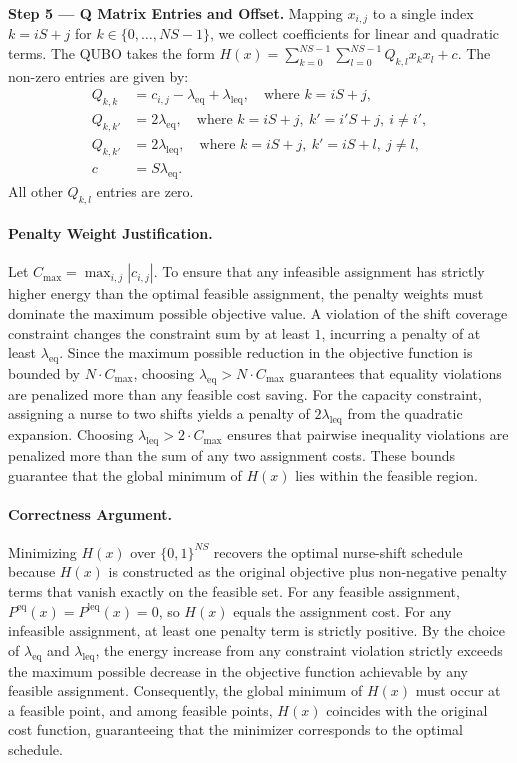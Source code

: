 \documentclass[12pt]{article}
\begin{document}
\textbf{Step 5 --- Q Matrix Entries and Offset.}
Mapping $x_{i,j}$ to a single index $k = iS + j$ for $k \in \{0, \dots, NS-1\}$, we collect coefficients for linear and quadratic terms. The QUBO takes the form $H(x) = \sum_{k=0}^{NS-1} \sum_{l=0}^{NS-1} Q_{k,l} x_k x_l + c$. The non-zero entries are given by:
\begin{align}
Q_{k,k} &= c_{i,j} - \lambda_{\text{eq}} + \lambda_{\text{leq}}, \quad \text{where } k = iS + j, \\
Q_{k,k'} &= 2\lambda_{\text{eq}}, \quad \text{where } k = iS + j, \ k' = i'S + j, \ i \neq i', \\
Q_{k,k'} &= 2\lambda_{\text{leq}}, \quad \text{where } k = iS + j, \ k' = iS + l, \ j \neq l, \\
c &= S \lambda_{\text{eq}}.
\end{align}
All other $Q_{k,l}$ entries are zero.

\paragraph{Penalty Weight Justification.}
Let $C_{\max} = \max_{i,j} |c_{i,j}|$. To ensure that any infeasible assignment has strictly higher energy than the optimal feasible assignment, the penalty weights must dominate the maximum possible objective value. A violation of the shift coverage constraint changes the constraint sum by at least $1$, incurring a penalty of at least $\lambda_{\text{eq}}$. Since the maximum possible reduction in the objective function is bounded by $N \cdot C_{\max}$, choosing $\lambda_{\text{eq}} > N \cdot C_{\max}$ guarantees that equality violations are penalized more than any feasible cost saving. For the capacity constraint, assigning a nurse to two shifts yields a penalty of $2\lambda_{\text{leq}}$ from the quadratic expansion. Choosing $\lambda_{\text{leq}} > 2 \cdot C_{\max}$ ensures that pairwise inequality violations are penalized more than the sum of any two assignment costs. These bounds guarantee that the global minimum of $H(x)$ lies within the feasible region.

\paragraph{Correctness Argument.}
Minimizing $H(x)$ over $\{0,1\}^{NS}$ recovers the optimal nurse-shift schedule because $H(x)$ is constructed as the original objective plus non-negative penalty terms that vanish exactly on the feasible set. For any feasible assignment, $P^{\text{eq}}(x) = P^{\text{leq}}(x) = 0$, so $H(x)$ equals the assignment cost. For any infeasible assignment, at least one penalty term is strictly positive. By the choice of $\lambda_{\text{eq}}$ and $\lambda_{\text{leq}}$, the energy increase from any constraint violation strictly exceeds the maximum possible decrease in the objective function achievable by any feasible assignment. Consequently, the global minimum of $H(x)$ must occur at a feasible point, and among feasible points, $H(x)$ coincides with the original cost function, guaranteeing that the minimizer corresponds to the optimal schedule.
\end{document}
